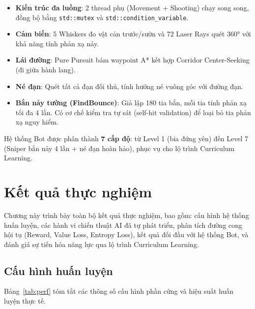 \documentclass[a4paper, 12pt]{report}
\begin{document}
  \begin{itemize}
    \item \textbf{Kiến trúc đa luồng}: 2 thread phụ (Movement + Shooting) chạy song song, đồng bộ bằng \texttt{std::mutex} và \texttt{std::condition\_variable}.
    \item \textbf{Cảm biến}: 5 Whiskers đo vật cản trước/sườn và 72 Laser Rays quét 360° với khả năng tính phản xạ nảy.
    \item \textbf{Lái đường}: Pure Pursuit bám waypoint A* kết hợp Corridor Center-Seeking (đi giữa hành lang).
    \item \textbf{Né đạn}: Quét tất cả đạn đối thủ, tính hướng né vuông góc với đường đạn.
    \item \textbf{Bắn nảy tường (FindBounce)}: Giả lập 180 tia bắn, mỗi tia tính phản xạ tối đa 4 lần. Có cơ chế kiểm tra tự sát (self-hit validation) để loại bỏ tia phản xạ nguy hiểm.
  \end{itemize}

  Hệ thống Bot được phân thành \textbf{7 cấp độ}: từ Level 1 (bia đứng yên) đến Level 7 (Sniper bắn nảy 4 lần + né đạn hoàn hảo), phục vụ cho lộ trình Curriculum Learning.

  \chapter{Kết quả thực nghiệm}

  Chương này trình bày toàn bộ kết quả thực nghiệm, bao gồm: cấu hình hệ thống huấn luyện, các hành vi chiến thuật AI đã tự phát triển, phân tích đường cong hội tụ (Reward, Value Loss, Entropy Loss), kết quả đối đầu với hệ thống Bot, và đánh giá sự tiến hóa năng lực qua lộ trình Curriculum Learning.

  \section{Cấu hình huấn luyện}

  Bảng~\ref{tab:perf} tóm tắt các thông số cấu hình phần cứng và hiệu suất huấn luyện thực tế.
\end{document}
